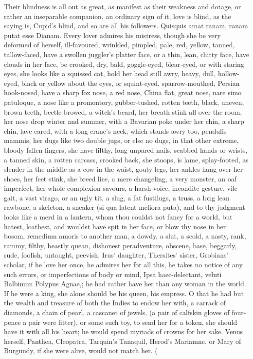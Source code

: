 {Their blindness is all out as great, as manifest as their weakness and
dotage, or rather an inseparable companion, an ordinary sign of it,
love is blind, as the saying is, Cupid's blind, and so are all
his followers. Quisquis amat ranam, ranam putat esse Dianam. Every
lover admires his mistress, though she be very deformed of herself,
ill-favoured, wrinkled, pimpled, pale, red, yellow, tanned,
tallow-faced, have a swollen juggler's platter face, or a thin, lean,
chitty face, have clouds in her face, be crooked, dry, bald,
goggle-eyed, blear-eyed, or with staring eyes, she looks like a
squissed cat, hold her head still awry, heavy, dull, hollow-eyed, black
or yellow about the eyes, or squint-eyed, sparrow-mouthed, Persian
hook-nosed, have a sharp fox nose, a red nose, China flat, great nose,
nare simo patuloque, a nose like a promontory, gubber-tushed, rotten
teeth, black, uneven, brown teeth, beetle browed, a witch's beard, her
breath stink all over the room, her nose drop winter and summer, with a
Bavarian poke under her chin, a sharp chin, lave eared, with a long
crane's neck, which stands awry too, pendulis mammis, her dugs like two
double jugs, or else no dugs, in that other extreme, bloody fallen
fingers, she have filthy, long unpared nails, scabbed hands or wrists,
a tanned skin, a rotten carcass, crooked back, she stoops, is lame,
splay-footed, as slender in the middle as a cow in the waist, gouty
legs, her ankles hang over her shoes, her feet stink, she breed lice, a
mere changeling, a very monster, an oaf imperfect, her whole complexion
savours, a harsh voice, incondite gesture, vile gait, a vast virago, or
an ugly tit, a slug, a fat fustilugs, a truss, a long lean rawbone, a
skeleton, a sneaker (si qua latent meliora puta), and to thy judgment
looks like a merd in a lantern, whom thou couldst not fancy for a
world, but hatest, loathest, and wouldst have spit in her face, or blow
thy nose in her bosom, remedium amoris to another man, a dowdy, a slut,
a scold, a nasty, rank, rammy, filthy, beastly quean, dishonest
peradventure, obscene, base, beggarly, rude, foolish, untaught,
peevish, Irus' daughter, Thersites' sister, Grobians' scholar, if he
love her once, he admires her for all this, he takes no notice of any
such errors, or imperfections of body or mind, Ipsa
haec-delectant, veluti Balbinum Polypus Agnae,; he had rather have her
than any woman in the world. If he were a king, she alone should be his
queen, his empress. O that he had but the wealth and treasure of both
the Indies to endow her with, a carrack of diamonds, a chain of pearl,
a cascanet of jewels, (a pair of calfskin gloves of four-pence a pair
were fitter), or some such toy, to send her for a token, she should
have it with all his heart; he would spend myriads of crowns for her
sake. Venus herself, Panthea, Cleopatra, Tarquin's Tanaquil, Herod's
Mariamne, or Mary of Burgundy, if she were alive, would not match
her.
(

}
